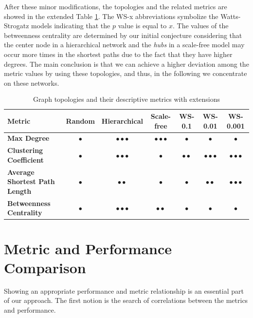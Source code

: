 After these minor modifications, the topologies and the related metrics are showed in the extended Table \ref{tab:topology_metrics2}. The \textsf{WS-x} abbreviations symbolize the Watts-Strogatz models indicating that the $p$ value is equal to $x$. The values of the betweenness centrality are determined by our initial conjecture considering that the center node in a hierarchical network and the \textit{hubs} in a scale-free model may occur more times in the shortest paths due to the fact that they have higher degrees. The main conclusion is that we can achieve a higher deviation among the metric values by using these topologies, and thus, in the following we concentrate on these networks.
\begin{table}[ht]
	\footnotesize
	\centering
	
	\begin{tabular}{ l c c c c c c}
		\toprule
		Metric & Random & Hierarchical & Scale-free & WS-0.1 & WS-0.01 & WS-0.001 \\ 
		\midrule 
		\textbf{Max Degree} & $\bullet$ & $\bullet \bullet \bullet$ & $\bullet \bullet \bullet$ & $\bullet$ & $\bullet$ & $\bullet$ \\ \hline
		\textbf{Clustering Coefficient} & $\bullet$ & $\bullet \bullet \bullet$ & $\bullet$ & $\bullet \bullet$ & $\bullet \bullet \bullet$ & $\bullet \bullet \bullet$\\ \hline
		\textbf{Average Shortest Path Length} & $\bullet$ & $\bullet \bullet$ & $\bullet$ & $\bullet $ & $\bullet \bullet$ & $\bullet \bullet \bullet$\\ \hline
		\textbf{Betweenness Centrality} & $\bullet$ & $\bullet \bullet \bullet$ & $\bullet \bullet$ & $\bullet$ & $\bullet$ & $\bullet$\\ \hline
		\bottomrule
	\end{tabular}
	\caption{Graph topologies and their descriptive metrics with extensions}
	\label{tab:topology_metrics2}
\end{table}

\section{Metric and Performance Comparison}

Showing an appropriate performance and metric relationship is an essential part of our approach. The first notion is the search of correlations between the metrics and performance.

